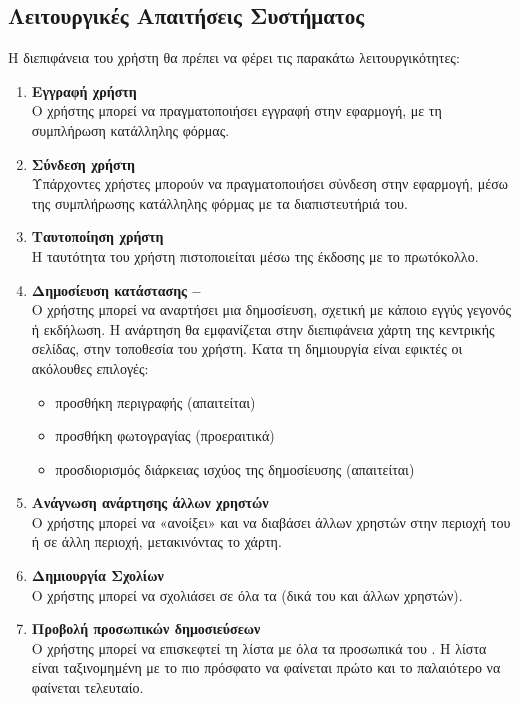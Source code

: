 \subsection{Λειτουργικές Απαιτήσεις Συστήματος}
Η διεπιφάνεια του χρήστη θα πρέπει να φέρει τις παρακάτω λειτουργικότητες:

\begin{enumerate}
    \item \textbf{Εγγραφή χρήστη} \\
    Ο χρήστης μπορεί να πραγματοποιήσει εγγραφή στην εφαρμογή, με τη συμπλήρωση κατάλληλης φόρμας.
    \item \textbf{Σύνδεση χρήστη} \\
    Υπάρχοντες χρήστες μπορούν να πραγματοποιήσει σύνδεση στην εφαρμογή, μέσω της συμπλήρωσης κατάλληλης φόρμας με τα διαπιστευτήριά του.
    \item \textbf{Ταυτοποίηση χρήστη} \\
    Η ταυτότητα του χρήστη πιστοποιείται μέσω της έκδοσης  με το  πρωτόκολλο.
    \item \textbf{Δημοσίευση κατάστασης -- } \\
    Ο χρήστης μπορεί να αναρτήσει μια δημοσίευση, σχετική με κάποιο εγγύς γεγονός ή εκδήλωση. Η ανάρτηση θα εμφανίζεται στην διεπιφάνεια χάρτη της κεντρικής σελίδας, στην τοποθεσία του χρήστη. Κατα τη δημιουργία  είναι εφικτές οι ακόλουθες επιλογές:
    \begin{itemize}
        \item προσθήκη περιγραφής (απαιτείται)
        \item προσθήκη φωτογραγίας (προεραιτικά)
        \item προσδιορισμός διάρκειας ισχύος της δημοσίευσης (απαιτείται)
    \end{itemize}
    \item \textbf{Ανάγνωση ανάρτησης άλλων χρηστών} \\
    Ο χρήστης μπορεί να «ανοίξει» και να διαβάσει  άλλων χρηστών στην περιοχή του ή σε άλλη περιοχή, μετακινόντας το χάρτη.
    \item \textbf{Δημιουργία Σχολίων} \\
    Ο χρήστης μπορεί να σχολιάσει σε όλα τα  (δικά του και άλλων χρηστών).
    \item \textbf{Προβολή προσωπικών δημοσιεύσεων} \\
    Ο χρήστης μπορεί να επισκεφτεί τη λίστα με όλα τα προσωπικά του . Η λίστα είναι ταξινομημένη με το πιο πρόσφατο  να φαίνεται πρώτο και το παλαιότερο  να φαίνεται τελευταίο.

\end{enumerate}
